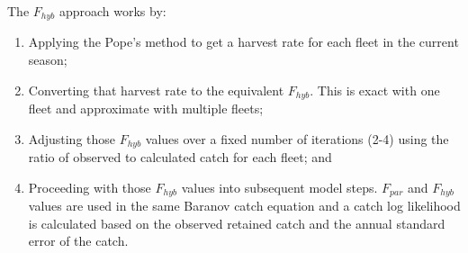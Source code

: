 The $F_{hyb}$ approach works by:
\begin{enumerate}
	\item Applying the Pope's method to get a harvest rate for each fleet in the current season;
	\item Converting that harvest rate to the equivalent $F_{hyb}$. This is exact with one fleet and approximate with multiple fleets;
	\item Adjusting those $F_{hyb}$ values over a fixed number of iterations (2-4) using the ratio of observed to calculated catch for each fleet; and
	\item Proceeding with those $F_{hyb}$ values into subsequent model steps. $F_{par}$ and $F_{hyb}$ values are used in the same Baranov catch equation and a catch log likelihood is calculated based on the observed retained catch and the annual standard error of the catch.
\end{enumerate}

